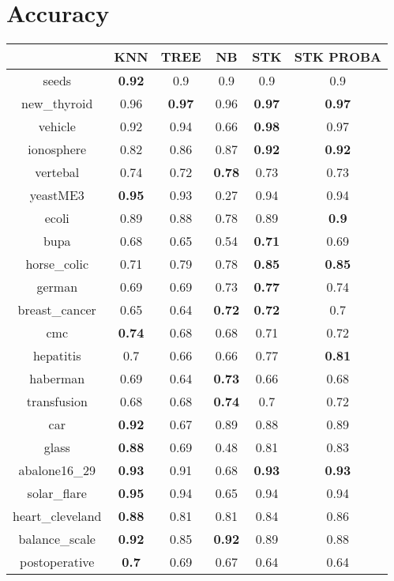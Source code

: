 \documentclass{article}%
\begin{document}
%
\normalsize%
\section*{Accuracy}%
\begin{tabular}{c|ccccc}%
&KNN&TREE&NB&STK&STK PROBA\\%
\hline%
seeds&\textbf{0.92}&0.9&0.9&0.9&0.9\\%
new\_thyroid&0.96&\textbf{0.97}&0.96&\textbf{0.97}&\textbf{0.97}\\%
vehicle&0.92&0.94&0.66&\textbf{0.98}&0.97\\%
ionosphere&0.82&0.86&0.87&\textbf{0.92}&\textbf{0.92}\\%
vertebal&0.74&0.72&\textbf{0.78}&0.73&0.73\\%
yeastME3&\textbf{0.95}&0.93&0.27&0.94&0.94\\%
ecoli&0.89&0.88&0.78&0.89&\textbf{0.9}\\%
bupa&0.68&0.65&0.54&\textbf{0.71}&0.69\\%
horse\_colic&0.71&0.79&0.78&\textbf{0.85}&\textbf{0.85}\\%
german&0.69&0.69&0.73&\textbf{0.77}&0.74\\%
breast\_cancer&0.65&0.64&\textbf{0.72}&\textbf{0.72}&0.7\\%
cmc&\textbf{0.74}&0.68&0.68&0.71&0.72\\%
hepatitis&0.7&0.66&0.66&0.77&\textbf{0.81}\\%
haberman&0.69&0.64&\textbf{0.73}&0.66&0.68\\%
transfusion&0.68&0.68&\textbf{0.74}&0.7&0.72\\%
car&\textbf{0.92}&0.67&0.89&0.88&0.89\\%
glass&\textbf{0.88}&0.69&0.48&0.81&0.83\\%
abalone16\_29&\textbf{0.93}&0.91&0.68&\textbf{0.93}&\textbf{0.93}\\%
solar\_flare&\textbf{0.95}&0.94&0.65&0.94&0.94\\%
heart\_cleveland&\textbf{0.88}&0.81&0.81&0.84&0.86\\%
balance\_scale&\textbf{0.92}&0.85&\textbf{0.92}&0.89&0.88\\%
postoperative&\textbf{0.7}&0.69&0.67&0.64&0.64\\%
\end{tabular}

%
\end{document}
